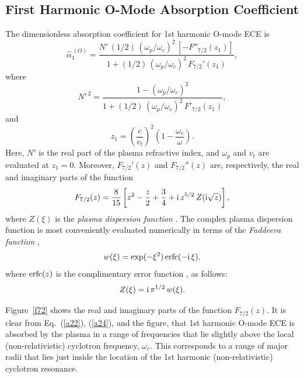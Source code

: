 \documentclass{iopjournal}
\begin{document}
\subsection{First Harmonic O-Mode Absorption Coefficient} 
The dimensionless absorption coefficient for 1st harmonic O-mode ECE is \cite{bornatici}
\begin{equation}\label{a22}
\hat{\alpha}_1^{\,(O)}=\frac{N'\,(1/2)\,(\omega_p/\omega_c)^2\,[-F''_{7/2}(z_1)]}{1+(1/2)\,(\omega_p/\omega_c)^2\,F_{7/2}'(z_1)},
\end{equation}
where
\begin{equation}
N'^{\,2}=\frac{1-(\omega_p/\omega_c)^2}{1+(1/2)\,(\omega_p/\omega_c)^2\,F'_{7/2}(z_1)},
\end{equation}
and
\begin{equation}\label{a24}
z_1=\left(\frac{c}{v_t}\right)^2\left(1-\frac{\omega_c}{\omega}\right).
\end{equation}
Here, $N'$ is the real part of the plasma refractive index, and $\omega_p$ and $v_t$ are evaluated at $z_1=0$. Moreover,
$F_{7/2}'(z)$ and $F_{7/2}''(z)$ are, respectively,  the real and imaginary parts of
the function \cite{bornatici}
\begin{equation}
F_{7/2}(z) =\frac{8}{15}\left[z^2-\frac{z}{2}+\frac{3}{4}+{\rm i}\,z^{5/2}\,Z({\rm i}\sqrt{z})\right],
\end{equation}
where $Z(\xi)$ is the {\em plasma dispersion function} \cite{plasma}. The complex plasma dispersion function is most conveniently evaluated numerically 
in terms of the {\em Faddeeva function}\/ \cite{faddeeva}, 
\begin{equation}
w(\xi) = \exp(-\xi^2)\,{\rm erfc}(-{\rm i}\,\xi).
\end{equation}
where ${\rm erfc}(z)$ is the complimentary error function \cite{as},  
as follows:
\begin{equation}
Z(\xi)= {\rm i}\,\pi^{1/2}\,w(\xi).
\end{equation}

 Figure~\ref{f72} shows the real and imaginary parts of the function $F_{7/2}(z)$. It is clear from Eq.~(\ref{a22}),
(\ref{a24}), and the figure, that 1st harmonic O-mode  ECE is absorbed by the plasma in a range of frequencies that lie slightly above the local (non-relativistic) cyclotron frequency,
$\omega_c$. This corresponds to a range of major radii that lies just inside the location of the 1st harmonic (non-relativistic) cyclotron resonance. 
\end{document}
